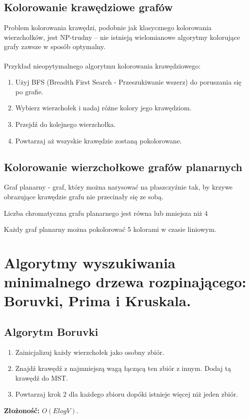 \documentclass[12pt]{article}
\begin{document}
    \subsection{Kolorowanie krawędziowe grafów}
    Problem kolorowania krawędzi, podobnie jak klasycznego kolorowania wierzchołków, jest NP-trudny – nie istnieją wielomianowe algorytmy kolorujące grafy zawsze w sposób optymalny.
    \\\\
    Przykład nieopytymalnego algorytmu kolorowania krawędziowego:
    \begin{enumerate}
        \item Użyj BFS (Breadth First Search - Przeszukiwanie wszerz) do poruszania się po grafie.
        \item Wybierz wierzchołek i nadaj różne kolory jego krawędziom.
        \item Przejdź do kolejnego wierzchołka.
        \item Powtarzaj aż wszyskie krawędzie zostaną pokolorowane.
    \end{enumerate}
    
    \subsection{Kolorowanie wierzchołkowe grafów planarnych}
    
    \begin{definition}
        Graf planarny - graf, który można narysować na płaszczyźnie tak, by krzywe obrazujące krawędzie grafu nie przecinały się ze sobą.
    \end{definition}
    
    \begin{theorem}
        Liczba chromatyczna grafu planarnego jest równa lub mniejsza niż 4
    \end{theorem}
    
    Każdy graf planarny można pokolorować 5 kolorami w czasie liniowym.
    
    
    
    
    
    \newpage
    
    \section{Algorytmy wyszukiwania minimalnego drzewa rozpinającego: Boruvki, Prima i Kruskala.}
    
    \subsection{Algorytm Boruvki}
    \begin{enumerate}
        \item Zainicjalizuj każdy wierzchołek jako osobny zbiór.
        \item Znajdź krawędź z najmniejszą wagą łączącą ten zbiór z innym. Dodaj tą krawędź do MST.
        \item Powtarzaj krok 2 dla każdego zbioru dopóki istnieje więcej niż jeden zbiór.
    \end{enumerate}
    \textbf{Złożoność:} $O(ElogV)$.
    
\end{document}
